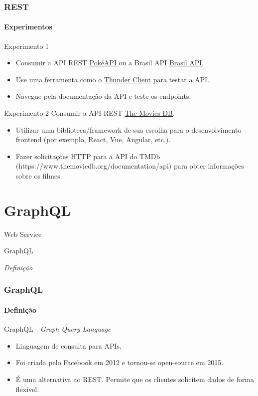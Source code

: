 \documentclass[
	9pt, %
	t, %
]{beamer}
\begin{document}
\begin{frame}
	\frametitle{REST}
	\framesubtitle{Experimentos}
	{\small 
	\begin{block}{Experimento 1}
		\begin{itemize}
			\item Consumir a API REST \href{https://pokeapi.co/}{PokéAPI} ou a Brasil API \href{https://brasilapi.com.br/docs}{Brasil API}.
			\item Use uma ferramenta como o \href{https://www.thunderclient.com/}{Thunder Client} para testar a API.
			\item Navegue pela documentação da API e teste os endpoints.
		\end{itemize}
	\end{block}

	\begin{block}{Experimento 2}
		Consumir a API REST \href{https://www.themoviedb.org/}{The Movies DB}.
		\begin{itemize}
			\item Utilizar uma biblioteca/framework de sua escolha para o desenvolvimento frontend (por exemplo, React, Vue, Angular, etc.).
			\item Fazer solicitações HTTP para a API do TMDb (https://www.themoviedb.org/documentation/api) para obter informações sobre os filmes.
		\end{itemize}
	\end{block}
	}

\end{frame}

\section{GraphQL}

\begin{frame}
	\begin{center}
		
		\bigskip\bigskip\bigskip\bigskip %
		{\Large Web Service}
		
		\bigskip\bigskip %
		{\Huge GraphQL}
		
		\smallskip
		{\small \textit{Definição}}
	\end{center}

\end{frame}

\begin{frame}
	\frametitle{GraphQL}
	\framesubtitle{Definição}

	\begin{block}{GraphQL - \textit{Graph Query Language}}
		\begin{itemize}
			\item Linguagem de consulta para APIs.
			\item Foi criada pelo Facebook em 2012 e tornou-se open-source em 2015.
			\item É uma alternativa ao REST. Permite que os clientes solicitem dados de forma flexível.
		\end{itemize}
	\end{block}

\end{frame}
\end{document}
